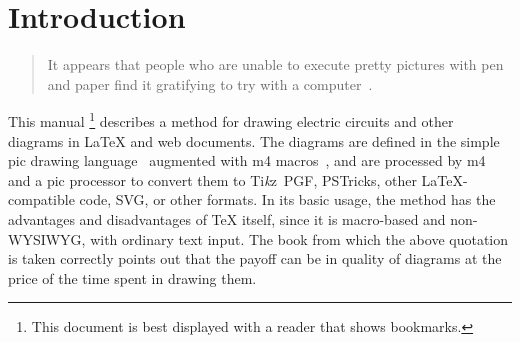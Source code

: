 \newcommand{\bq}{}
\newcommand{\dpic}{{\bq dpic}\xspace}
\newcommand{\Dpic}{{\bq Dpic}\xspace}
\newcommand{\dvips}{{\bq dvips}\xspace}
\newcommand{\gpic}{{\bq gpic}\xspace}
\newcommand{\Gpic}{{\bq Gpic}\xspace}
\newcommand{\groff}{{\bq groff}\xspace}
\newcommand{\latex}{\LaTeX\xspace}
\newcommand{\linespec}{{\sl linespec}\xspace}
\newcommand{\MetaPost}{{\bq MetaPost}\xspace}
\newcommand{\Mfour}{{\bq m4}\xspace}
\newcommand{\mfpic}{{\bq mfpic}\xspace}
\newcommand{\PDF}{{\bq PDF}\xspace}
\newcommand{\pic}{{\bq pic}\xspace}
\newcommand{\Pic}{{\bq Pic}\xspace}
\newcommand{\Postscript}{{\bq Postscript}\xspace}
\newcommand{\PSTricks}{{\bq PSTricks}\xspace}
\newcommand{\SVG}{{\bq SVG}\xspace}
\newcommand{\tex}{\TeX\xspace}
\newcommand{\Textregistered}{\textregistered\xspace}
\newcommand{\TPGF}{{\bq Ti{\it k}z~PGF}\xspace}
\newcommand{\Tikz}{{\bq Ti{\it k}z}\xspace}
\newcommand{\tpic}{{\bq tpic}\xspace}
\newcommand{\xfig}{{\bq xfig}\xspace}
\newcommand{\Xfig}{{\bq Xfig}\xspace}
%
\newcommand{\xection}[1]{\section[\texorpdfstring{#1\ \dotfill}{#1}]{#1}}
\newcommand{\NVL}{\\\hspace*{\parindent}}
\newcommand{\brtt}{\hfill\break\hspace*\parindent}
\newcommand{\lbr}{{\tt\char123}}
\newcommand{\rbr}{{\tt\char125}}
\newcommand{\bsl}{{\tt\char92}}
\newcommand{\SR}[1]{\hyperref[#1]{Section~\ref*{#1}}}
\newcommand{\PR}[1]{\hyperref[#1]{page~\pageref*{#1}}}
\newcommand{\FR}[1]{\hyperref[#1]{Figure~\ref*{#1}}}
\newcommand{\FRS}[1]{\hyperref[#1]{Figures~\ref*{#1}}}
\newcommand{\MR}[2]{\hyperref[#1]{#2}}
\newcommand{\REF}[1]{\hyperref[#1]{\ref*{#1}}}
\newcommand{\LQ}{\char96}
\newcommand{\RQ}{\char39}
%
\newcommand{\Example}[1]{\vspace{\parsep}\noindent {\bf Example #1:}}
%
%
\xection{Introduction\label{Introduction:}}
   \begin{quotation}\noindent
   It appears that people
   who are unable to execute pretty pictures with pen and paper find it
   gratifying to try with a computer~\cite{Landauer95}.
   \end{quotation}

This manual%
\footnote{This document is best displayed with a reader that shows bookmarks.}
describes a method for drawing electric circuits and
other diagrams in \latex and web documents.
The diagrams are defined in the simple \pic drawing language~\cite{KRpic}
augmented with \Mfour macros~\cite{KRm4,GnuM4}, and are
processed by \Mfour and a \pic processor to
convert them to \TPGF, \PSTricks, other \latex-compatible code, \SVG,
or other formats.
In its basic usage, the method has the advantages and disadvantages of
\tex itself, since it is macro-based and non-WYSIWYG,
with ordinary text input.  The book from which the above quotation
is taken correctly points out that the payoff can be in quality of
diagrams at the price of the time spent in drawing them.

